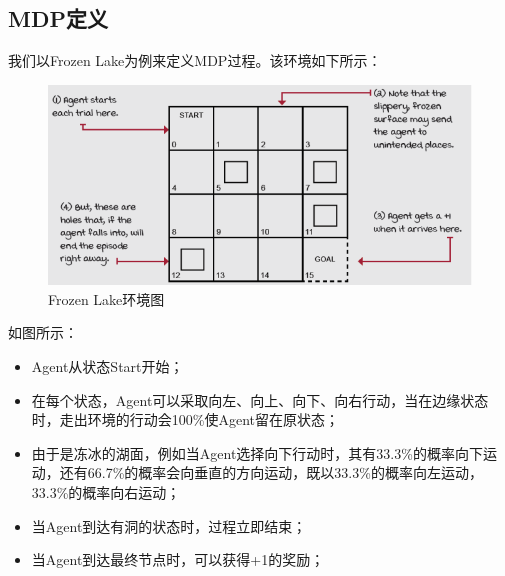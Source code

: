 \subsection{MDP定义}
我们以Frozen Lake为例来定义MDP过程。该环境如下所示：
\begin{figure}[H]
	\caption{Frozen Lake环境图}
	\label{p000006}
	\centering
	\includegraphics[width=15cm]{images/p000006}
\end{figure}
如图所示：
\begin{itemize}
    \item Agent从状态Start开始；
    \item 在每个状态，Agent可以采取向左、向上、向下、向右行动，当在边缘状态时，走出环境的行动会100\%使Agent留在原状态；
    \item 由于是冻冰的湖面，例如当Agent选择向下行动时，其有33.3\%的概率向下运动，还有66.7\%的概率会向垂直的方向运动，既以33.3\%的概率向左运动，33.3\%的概率向右运动；
    \item 当Agent到达有洞的状态时，过程立即结束；
    \item 当Agent到达最终节点时，可以获得+1的奖励；
\end{itemize}

